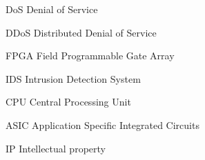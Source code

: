 \begin{siglas}\setlength{\labelwidth}{15ex} \setlength{\itemsep}{0.0001\baselineskip}
  \item  [DoS] Denial of Service
  \item[DDoS] Distributed Denial of Service 
  \item [FPGA] Field Programmable Gate Array
  \item [IDS]  Intrusion Detection System
  \item [CPU]  Central Processing Unit
  \item [ASIC] Application Specific Integrated Circuits
  \item [IP] Intellectual property
  
   
\end{siglas}
